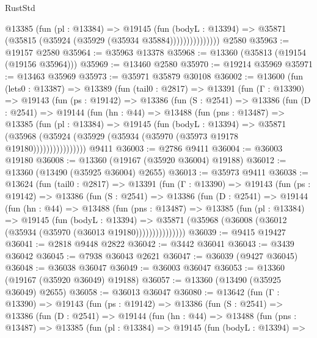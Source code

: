 \begin{lexlean}{RustStd}
\begin{coremodule}
                    @13385
                      (fun (pl : @13384) =>
                      @19145
                        (fun (bodyL : @13394) =>
                        @35871 (@35815 (@35924 (@35929 (@35934 @35884)))))))))))))))
    @2580
@35963 := @19157 @2580
@35964 := @35963 @13378
@35968 := @13360 (@35813 (@19154 (@19156 @35964)))
@35969 := @13460 @2580
@35970 := @19214 @35969
@35971 := @13463 @35969
@35973 := @35971 @35879 @30108
@36002 := @13600
    (fun (lets0 : @13387) =>
    @13389
      (fun (tail0 : @2817) =>
      @13391
        (fun (Γ : @13390) =>
        @19143
          (fun (ps : @19142) =>
          @13386
            (fun (S : @2541) =>
            @13386
              (fun (D : @2541) =>
              @19144
                (fun (hn : @44) =>
                @13488
                  (fun (pns : @13487) =>
                  @13385
                    (fun (pl : @13384) =>
                    @19145
                      (fun (bodyL : @13394) =>
                      @35871
                        (@35968
                          (@35924 (@35929 (@35934 (@35970 (@35973 @19178 @19180))))))))))))))))
    @9411
@36003 := @2786 @9411
@36004 := @36003 @19180
@36008 := @13360 (@19167 (@35920 @36004) @19188)
@36012 := @13360 (@13490 (@35925 @36004) @2655)
@36013 := @35973 @9411
@36038 := @13624
    (fun (tail0 : @2817) =>
    @13391
      (fun (Γ : @13390) =>
      @19143
        (fun (ps : @19142) =>
        @13386
          (fun (S : @2541) =>
          @13386
            (fun (D : @2541) =>
            @19144
              (fun (hn : @44) =>
              @13488
                (fun (pns : @13487) =>
                @13385
                  (fun (pl : @13384) =>
                  @19145
                    (fun (bodyL : @13394) =>
                    @35871 (@35968 (@36008 (@36012 (@35934 (@35970 (@36013 @19180)))))))))))))))
@36039 := @9415 @19427
@36041 := @2818 @9448 @2822
@36042 := @3442 @36041
@36043 := @3439 @36042
@36045 := @7938 @36043 @2621
@36047 := @36039 (@9427 @36045)
@36048 := @36038 @36047
@36049 := @36003 @36047
@36053 := @13360 (@19167 (@35920 @36049) @19188)
@36057 := @13360 (@13490 (@35925 @36049) @2655)
@36058 := @36013 @36047
@36080 := @13642
    (fun (Γ : @13390) =>
    @19143
      (fun (ps : @19142) =>
      @13386
        (fun (S : @2541) =>
        @13386
          (fun (D : @2541) =>
          @19144
            (fun (hn : @44) =>
            @13488
              (fun (pns : @13487) =>
              @13385
                (fun (pl : @13384) =>
                @19145
                  (fun (bodyL : @13394) =>

\end{coremodule}
\end{lexlean}
